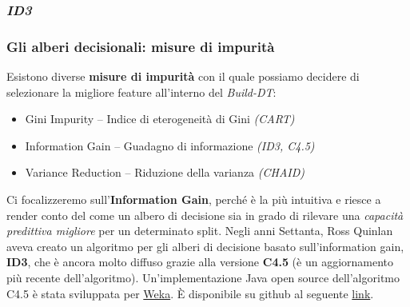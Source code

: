 \subsubsection[ID3]{\textit{ID3}}
\begin{frame}
	
	\frametitle{Gli alberi decisionali: misure di impurità}
	
	Esistono diverse \textbf{misure di impurità} con il quale possiamo decidere di selezionare la migliore feature all'interno del \textit{Build-DT}:
	\begin{itemize}
		\item Gini Impurity -- Indice di eterogeneità di Gini \textit{(CART)}
		\item Information Gain -- Guadagno di informazione \textit{(ID3, C4.5)}
		\item Variance Reduction -- Riduzione della varianza \textit{(CHAID)}
	\end{itemize}
	
	\pause
	Ci focalizzeremo sull'\textbf{Information Gain}, perché è la più intuitiva e riesce a render conto del come un albero di decisione sia in grado di rilevare una \textit{capacità predittiva migliore} per un determinato split.
	\pause
	\newlinedouble
	Negli anni Settanta, Ross Quinlan aveva creato un algoritmo per gli alberi di decisione basato sull'information gain, \textbf{ID3}, che è ancora molto diffuso grazie alla versione \textbf{C4.5} (è un aggiornamento più recente dell'algoritmo).
	Un'implementazione Java open source dell'algoritmo C4.5 è stata sviluppata per \href{https://www.cs.waikato.ac.nz/ml/weka/index.html}{Weka}. È disponibile su github al seguente \href{https://github.com/Waikato/weka-3.8/blob/master/weka/src/main/java/weka/classifiers/trees/J48.java}{link}.

\end{frame}


